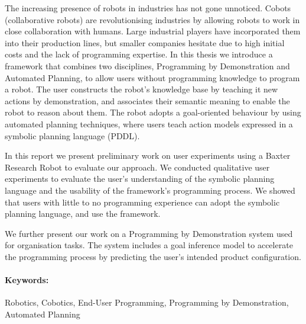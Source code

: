 The increasing presence of robots in industries has not gone unnoticed. 
Cobots (collaborative robots) are revolutionising industries by allowing robots to work in close collaboration with humans.
Large industrial players have incorporated them into their production lines, but smaller companies hesitate due to high initial costs and the lack of programming expertise. 
In this thesis we introduce a framework that combines two disciplines, Programming by Demonstration and Automated Planning, to allow users without programming knowledge to program a robot. 
The user constructs the robot's knowledge base by teaching it new actions by demonstration, and associates their semantic meaning to enable the robot to reason about them. 
The robot adopts a goal-oriented behaviour by using automated planning techniques, where users teach action models expressed in a symbolic planning language (PDDL).

In this report we present preliminary work on user experiments using a Baxter Research Robot to evaluate our approach.
We conducted qualitative user experiments to evaluate the user's understanding of the symbolic planning language and the usability of the framework's programming process.
We showed that users with little to no programming experience can adopt the symbolic planning language, and use the framework.

We further present our work on a Programming by Demonstration system used for organisation tasks.
The system includes a goal inference model to accelerate the programming process by predicting the user's intended product configuration.

\paragraph{Keywords:} Robotics, Cobotics, End-User Programming, Programming by Demonstration, Automated Planning